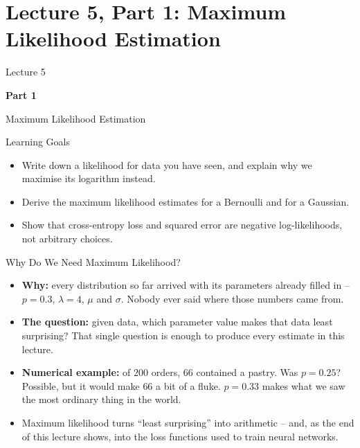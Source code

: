 \section{Lecture 5, Part 1: Maximum Likelihood Estimation}

\begin{frame}
\vfill
\centering
{\color{RLBlue}\large Lecture 5}

\vspace{0.3em}
{\color{RLBlue}\Large\bfseries Part 1}

\vspace{0.6em}
{\Large Maximum Likelihood Estimation}
\vfill
\end{frame}

\begin{frame}{Learning Goals}
\begin{itemize}
  \item Write down a likelihood for data you have seen, and explain why we maximise its logarithm instead.
  \pause
  \item Derive the maximum likelihood estimates for a Bernoulli and for a Gaussian.
  \pause
  \item Show that cross-entropy loss and squared error are negative log-likelihoods, not arbitrary choices.
\end{itemize}
\end{frame}

\begin{frame}{Why Do We Need Maximum Likelihood?}
\begin{itemize}
  \item \textbf{Why:} every distribution so far arrived with its parameters already filled in -- $p = 0.3$, $\lambda = 4$, $\mu$ and $\sigma$. Nobody ever said where those numbers came from.
  \pause
  \item \textbf{The question:} given data, which parameter value makes that data least surprising? That single question is enough to produce every estimate in this lecture.
  \pause
  \item \textbf{Numerical example:} of $200$ orders, $66$ contained a pastry. Was $p = 0.25$? Possible, but it would make $66$ a bit of a fluke. $p = 0.33$ makes what we saw the most ordinary thing in the world.
  \pause
  \item Maximum likelihood turns ``least surprising'' into arithmetic -- and, as the end of this lecture shows, into the loss functions used to train neural networks.
\end{itemize}
\end{frame}

